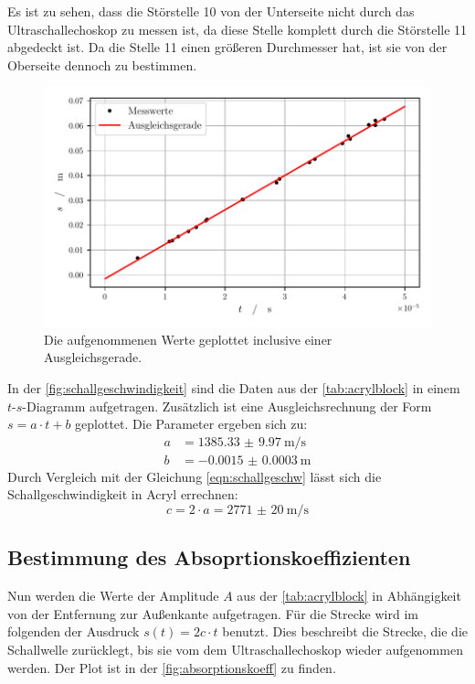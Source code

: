   \noindent Es ist zu sehen, dass die Störstelle 10 von der Unterseite nicht durch das Ultraschallechoskop zu messen ist, da diese Stelle komplett durch die 
  Störstelle 11 abgedeckt ist. Da die Stelle 11 einen größeren Durchmesser hat, ist sie von der Oberseite dennoch zu bestimmen. 

  \begin{figure}[H]
    \centering
    \includegraphics[width=\textwidth]{build/schallgeschwindigkeit.pdf}
    \caption{Die aufgenommenen Werte geplottet inclusive einer Ausgleichsgerade.}
    \label{fig:schallgeschwindigkeit}    
  \end{figure}

  \noindent In der \autoref{fig:schallgeschwindigkeit} sind die Daten aus der \autoref{tab:acrylblock} in einem $t$-$s$-Diagramm aufgetragen. Zusätzlich 
  ist eine Ausgleichsrechnung der Form $ s = a \cdot t + b $ geplottet. Die Parameter ergeben sich zu:
  \begin{align*}
    a &= \SI{1385.33(997)}{\metre\per\second}\\
    b &= \SI{-0.0015(3)}{\metre}
  \end{align*}
  Durch Vergleich mit der Gleichung \eqref{eqn:schallgeschw} lässt sich die Schallgeschwindigkeit in Acryl errechnen:
  \begin{equation*}
    c = 2 \cdot a = \SI{2771(20)}{\metre\per\second}
  \end{equation*}


\subsection{Bestimmung des Absoprtionskoeffizienten}

  Nun werden die Werte der Amplitude $A$ aus der \autoref{tab:acrylblock} in Abhängigkeit von der Entfernung zur Außenkante aufgetragen. Für die Strecke 
  wird im folgenden der Ausdruck $ s(t) = 2c \cdot t $ benutzt. Dies beschreibt die Strecke, die die Schallwelle zurücklegt, bis sie vom dem Ultraschallechoskop
  wieder aufgenommen werden. Der Plot ist in der \autoref{fig:absorptionskoeff} zu finden. 

